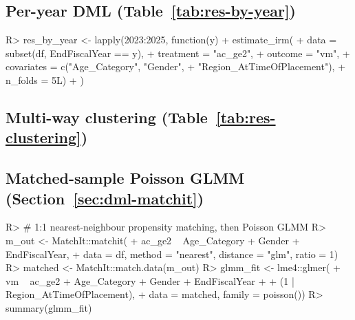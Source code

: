 \documentclass[article,shortnames,nojss]{jss}
\begin{document}
\subsection[Per-year DML]{Per-year DML (Table~\ref{tab:res-by-year})}

\begin{Code}
R> res_by_year <- lapply(2023:2025, function(y) {
+    estimate_irm(
+      data       = subset(df, EndFiscalYear == y),
+      treatment  = "ac_ge2",
+      outcome    = "vm",
+      covariates = c("Age_Category", "Gender",
+                     "Region_AtTimeOfPlacement"),
+      n_folds    = 5L)
+  })
\end{Code}

\subsection[Multi-way clustering]{Multi-way clustering (Table~\ref{tab:res-clustering})}


\subsection[Matched-sample Poisson GLMM]{Matched-sample Poisson GLMM (Section~\ref{sec:dml-matchit})}

\begin{Code}
R> # 1:1 nearest-neighbour propensity matching, then Poisson GLMM
R> m_out <- MatchIt::matchit(
+    ac_ge2 ~ Age_Category + Gender + EndFiscalYear,
+    data = df, method = "nearest", distance = "glm", ratio = 1)
R> matched <- MatchIt::match.data(m_out)
R> glmm_fit <- lme4::glmer(
+    vm ~ ac_ge2 + Age_Category + Gender + EndFiscalYear +
+         (1 | Region_AtTimeOfPlacement),
+    data = matched, family = poisson())
R> summary(glmm_fit)
\end{Code}
\end{document}
